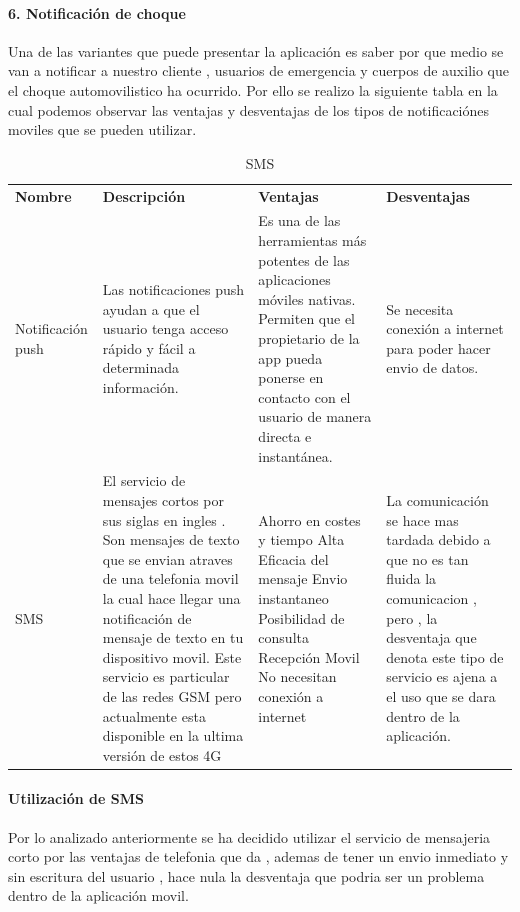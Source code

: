 \paragraph{6. Notificación de choque} 

Una de las variantes que puede presentar la aplicación es saber por que medio se van a notificar a nuestro cliente , usuarios de emergencia y cuerpos de auxilio que el choque automovilistico ha ocurrido. Por ello se realizo la siguiente tabla en la cual podemos observar las ventajas y desventajas de los tipos de notificaciónes moviles que se pueden utilizar.\\


\begin{table}[h!]
\begin{tabular}{|p{2cm}|p{4cm}|p{4cm}|p{4cm}|}
\hline
\textbf{Nombre}& \textbf{Descripción}&\textbf{Ventajas}& \textbf{Desventajas}\\
Notificación push & Las notificaciones push ayudan a que el usuario tenga acceso rápido y fácil a determinada información. & Es una de las herramientas más potentes de las aplicaciones móviles nativas. Permiten que el propietario de la app pueda ponerse en contacto con el usuario de manera directa e instantánea.& Se necesita conexión a internet para poder hacer envio de datos.\\
\hline
\hline
SMS & El servicio de mensajes cortos por sus siglas en ingles . Son mensajes de texto que se envian atraves de una telefonia movil la cual hace llegar una notificación de mensaje de texto en tu dispositivo movil. Este servicio es particular de las redes GSM pero actualmente esta disponible en la ultima versión de estos 4G & \begin{UClist}
		\UCli Ahorro en costes y tiempo
		\UCli Alta Eficacia del mensaje
		\UCli Envio instantaneo
		\UCli Posibilidad de consulta
		\UCli Recepción Movil
		\UCli No necesitan conexión a internet
\end{UClist} & La comunicación se hace mas tardada debido a que no es tan fluida la comunicacion , pero , la desventaja que denota  este tipo de servicio es ajena a el uso que se dara dentro de la aplicación. \\
\hline
\end{tabular}
\caption{SMS}
\label{disenoEstructura:SMS}
\end{table}
\paragraph{Utilización de SMS}
\begin{UClist}
\UCli Por lo analizado anteriormente se ha decidido utilizar el servicio de mensajeria corto por las ventajas de telefonia que da , ademas de tener un envio inmediato y sin escritura del usuario , hace nula la desventaja que podria ser un problema dentro de la aplicación movil.
\end{UClist}

